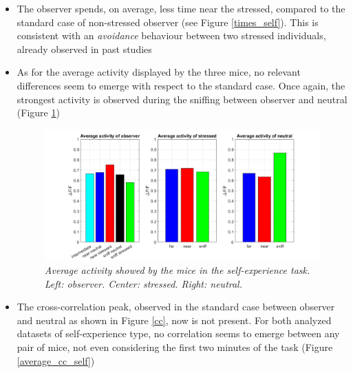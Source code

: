 \documentclass[12pt, a4paper]{report}
\begin{document}
\begin{itemize}
	\item The observer spends, on average, less time near the stressed, compared to the standard case of non-stressed observer (see Figure \ref{times_self}). This is consistent with an \textit{avoidance} behaviour between two stressed individuals, already observed in past studies \cite{24} %
	
	\item As for the average activity displayed by the three mice, no relevant differences seem to emerge with respect to the standard case. Once again, the strongest activity is observed during the sniffing between observer and neutral (Figure \ref{activity_barplot_self})
	
	\begin{figure}[H]
		
		\begin{center}
			\hspace*{-1.2cm}
			\includegraphics[scale=.48]{activity_barplot_self.png} 
		\end{center} 
		\caption{\textit{Average activity showed by the mice in the self-experience task. Left: observer. Center: stressed. Right: neutral.}}
		\label{activity_barplot_self}
	\end{figure}
	
	\item The cross-correlation peak, observed in the standard case between observer and neutral as shown in Figure \ref{cc}, now is not present. For both analyzed datasets of self-experience type, no correlation seems to emerge between any pair of mice, not even considering the first two minutes of the task (Figure \ref{average_cc_self})
	
	\begin{figure}[H]
		

\end{figure}
\end{itemize}
\end{document}
